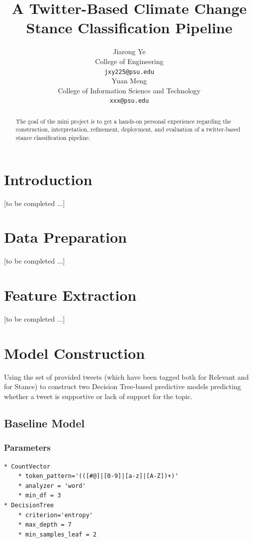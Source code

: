 \documentclass{article} %
\title{A Twitter-Based Climate Change Stance Classification Pipeline}
\author{
Jiarong Ye\\
College of Engineering\\
\texttt{jxy225@psu.edu} \\
\And
Yuan Meng\\
College of Information Science and Technology\\
\texttt{xxx@psu.edu} \\
}
\begin{document}
\maketitle

\begin{abstract}
The goal of the mini project is to get a hands-on personal experience regarding the construction, interpretation, refinement, deployment, and evaluation of a twitter-based stance classification pipeline.
\end{abstract}

\section{Introduction}

[to be completed ...]

\section{Data Preparation}


[to be completed ...]


\section{Feature Extraction}


[to be completed ...]

\section{Model Construction}

Using the set of provided tweets (which have been tagged both for Relevant and for Stance) to construct two Decision Tree-based predictive models predicting whether a tweet is supportive or lack of support for the topic.

\subsection{Baseline Model}

\subsubsection{Parameters}

\lstset{language=Python}
\lstset{showstringspaces=false}
\lstset{frame=lines}
\lstset{basicstyle=\footnotesize}
\begin{lstlisting}
* CountVector
	* token_pattern='(([#@]|[0-9]|[a-z]|[A-Z])+)'
	* analyzer = 'word'
	* min_df = 3
* DecisionTree
	* criterion='entropy'
	* max_depth = 7
	* min_samples_leaf = 2
\end{lstlisting}
\end{document}
